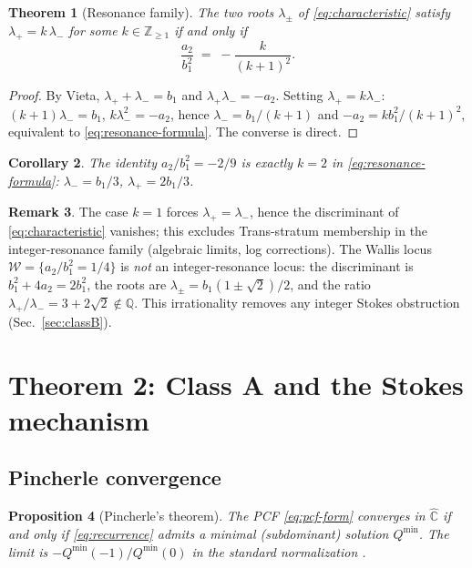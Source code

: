 \documentclass[11pt,a4paper]{article}
\newtheorem{theorem}{Theorem}
\newtheorem{proposition}[theorem]{Proposition}
\newtheorem{corollary}[theorem]{Corollary}
\theoremstyle{definition}
\newtheorem{remark}[theorem]{Remark}
\begin{document}
\begin{theorem}[Resonance family]\label{thm:resonance-family}
The two roots $\lambda_\pm$ of \eqref{eq:characteristic} satisfy $\lambda_+ = k\,\lambda_-$ for some $k\in\mathbb{Z}_{\ge 1}$ if and only if
\begin{equation}\label{eq:resonance-formula}
  \frac{a_2}{b_1^2} \;=\; -\frac{k}{(k+1)^2}.
\end{equation}
\end{theorem}

\begin{proof}
By Vieta, $\lambda_+ + \lambda_- = b_1$ and $\lambda_+ \lambda_- = -a_2$. Setting $\lambda_+ = k\lambda_-$:
$(k+1)\lambda_- = b_1$, $k\lambda_-^2 = -a_2$, hence $\lambda_- = b_1/(k+1)$ and $-a_2 = k b_1^2/(k+1)^2$, equivalent to \eqref{eq:resonance-formula}. The converse is direct.
\end{proof}

\begin{corollary}\label{cor:k=2}
The identity $a_2/b_1^2 = -2/9$ is exactly $k=2$ in \eqref{eq:resonance-formula}: $\lambda_- = b_1/3$, $\lambda_+ = 2b_1/3$.
\end{corollary}

\begin{remark}\label{rem:k1-and-wallis}
The case $k=1$ forces $\lambda_+ = \lambda_-$, hence the discriminant of \eqref{eq:characteristic} vanishes; this excludes Trans-stratum membership in the integer-resonance family (algebraic limits, log corrections). The Wallis locus $\mathcal{W} = \{a_2/b_1^2 = 1/4\}$ is \emph{not} an integer-resonance locus: the discriminant is $b_1^2+4a_2 = 2b_1^2$, the roots are $\lambda_\pm = b_1(1\pm\sqrt{2})/2$, and the ratio $\lambda_+/\lambda_- = 3+2\sqrt{2}\notin\mathbb{Q}$. This irrationality removes any integer Stokes obstruction (Sec.~\ref{sec:classB}).
\end{remark}

\section{Theorem 2: Class A and the Stokes mechanism}\label{sec:k2-stokes}

\subsection{Pincherle convergence}

\begin{proposition}[Pincherle's theorem]\label{prop:pincherle}
The PCF \eqref{eq:pcf-form} converges in $\widehat{\mathbb{C}}$ if and only if \eqref{eq:recurrence} admits a \emph{minimal} (subdominant) solution $Q^{\min}$. The limit is $-Q^{\min}(-1)/Q^{\min}(0)$ in the standard normalization \cite[Thm.~3.7]{lw1992}.
\end{proposition}
\end{document}
